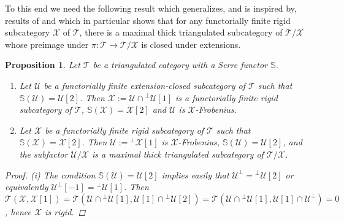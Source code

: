 \documentclass[oneside, a4paper,reqno]{amsart}
\numberwithin{equation}{section}
\newtheorem{prop}[thm]{Proposition}
\theoremstyle{definition}
\begin{document}
To this end we need the following result which generalizes, and is inspired by, results of \cite{BIRS} and which in particular shows that for any functorially finite rigid subcategory  ${\mathcal X}$ of ${\mathcal T}$, there is a maximal thick triangulated subcategory of ${\mathcal T}/{\mathcal X}$ whose preimage under $\pi \colon {\mathcal T} {\longrightarrow} {\mathcal T}/{\mathcal X}$ is closed under extensions.   

\begin{prop} Let ${\mathcal T}$ be a triangulated category  with a Serre functor $\mathbb S$.
\begin{enumerate} 
\item Let ${\mathcal U}$ be  a  functorially finite extension-closed subcategory of ${\mathcal T}$ such that $\mathbb S({\mathcal U}) = {\mathcal U}[2]$.  Then ${\mathcal X} := {\mathcal U} \cap {^{\bot}}{\mathcal U}[1]$ is a functorially finite rigid subcategory of ${\mathcal T}$, $\mathbb S({\mathcal X}) = {\mathcal X}[2]$ and ${\mathcal U}$ is ${\mathcal X}$-Frobenius. 
\item Let ${\mathcal X}$ be a functorially finite rigid subcategory of ${\mathcal T}$ such that $\mathbb S({\mathcal X}) = {\mathcal X}[2]$.  Then ${\mathcal U} := {^{\bot}}{\mathcal X}[1]$ is ${\mathcal X}$-Frobenius, $\mathbb S({\mathcal U}) = {\mathcal U}[2]$,  and the subfactor ${\mathcal U}/{\mathcal X}$ is a maximal thick triangulated subcategory of ${\mathcal T}/{\mathcal X}$. 
\end{enumerate} 
\begin{proof} (i) The condition $\mathbb S({\mathcal U}) = {\mathcal U}[2]$ implies easily that ${\mathcal U}^{\bot} = {^{\bot}}{\mathcal U}[2]$ or equivalently ${\mathcal U}^{\bot}[-1] = {^{\bot}}{\mathcal U}[1]$. Then ${\mathcal T}({\mathcal X},{\mathcal X}[1]) = {\mathcal T}({\mathcal U}\cap {^{\bot}}{\mathcal U}[1], {\mathcal U}[1]\cap {^{\bot}}{\mathcal U}[2]) = {\mathcal T}({\mathcal U}\cap {^{\bot}}{\mathcal U}[1], {\mathcal U}[1]\cap {\mathcal U}^{\bot}) = 0$, hence ${\mathcal X}$ is rigid.

\end{proof}
\end{prop}
\end{document}
